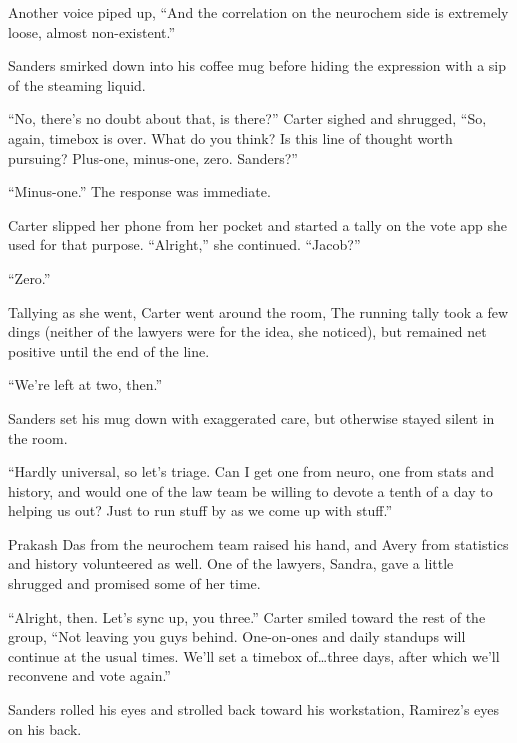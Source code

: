 Another voice piped up, ``And the correlation on the neurochem side is extremely loose, almost non-existent.''

Sanders smirked down into his coffee mug before hiding the expression with a sip of the steaming liquid.

``No, there's no doubt about that, is there?''  Carter sighed and shrugged, ``So, again, timebox is over.  What do you think?  Is this line of thought worth pursuing?  Plus-one, minus-one, zero.  Sanders?''

``Minus-one.''  The response was immediate.

Carter slipped her phone from her pocket and started a tally on the vote app she used for that purpose.  ``Alright,'' she continued.  ``Jacob?''

``Zero.''

Tallying as she went, Carter went around the room,  The running tally took a few dings (neither of the lawyers were for the idea, she noticed), but remained net positive until the end of the line.

``We're left at two, then.''

Sanders set his mug down with exaggerated care, but otherwise stayed silent in the room.

``Hardly universal, so let's triage.  Can I get one from neuro, one from stats and history, and would one of the law team be willing to devote a tenth of a day to helping us out?  Just to run stuff by as we come up with stuff.''

Prakash Das from the neurochem team raised his hand, and Avery from statistics and history volunteered as well.  One of the lawyers, Sandra, gave a little shrugged and promised some of her time.

``Alright, then.  Let's sync up, you three.''  Carter smiled toward the rest of the group, ``Not leaving you guys behind.  One-on-ones and daily standups will continue at the usual times.  We'll set a timebox of\ldots{}three days, after which we'll reconvene and vote again.''

Sanders rolled his eyes and strolled back toward his workstation, Ramirez's eyes on his back.
